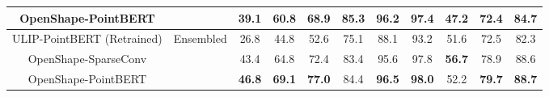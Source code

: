 \begin{table}[t]
\begin{tabular}{c|c|ccc|ccc|ccc}
     OpenShape-PointBERT & & 39.1 & 60.8 & 68.9 & \textbf{85.3} & 96.2 & 97.4 & 47.2 & 72.4 & 84.7 \\
    \midrule
    ULIP-PointBERT (Retrained) & \multirow{2}[2]{*}{Ensembled} & 26.8  & 44.8      & 52.6      & 75.1  & 88.1      & 93.2      & 51.6      & 72.5      & 82.3 \\
    OpenShape-SparseConv  &       & 43.4 & 64.8 & 72.4 & 83.4 & 95.6 & 97.8 & \textbf{56.7} &   78.9    & 88.6 \\
    OpenShape-PointBERT & & \textbf{46.8} & \textbf{69.1} & \textbf{77.0} & 84.4 & \textbf{96.5} & \textbf{98.0} & 52.2 & \textbf{79.7} & \textbf{88.7} \\
    \bottomrule
    \end{tabular}%
  \label{tab:zero}%
\end{table}%
